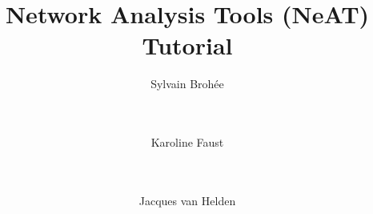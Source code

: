 \documentclass{book}
\begin{document}
\title{Network Analysis Tools (NeAT) \\
Tutorial}

\author{
	Sylvain Broh\'ee \\
	 \\
        \and \\
	Karoline Faust \\
	 \\
        \and \\
	Jacques van Helden \\
	\\
        \\
        \\
        \bigre 
}



\maketitle

\newpage
\tableofcontents
\newpage








\end{document}
